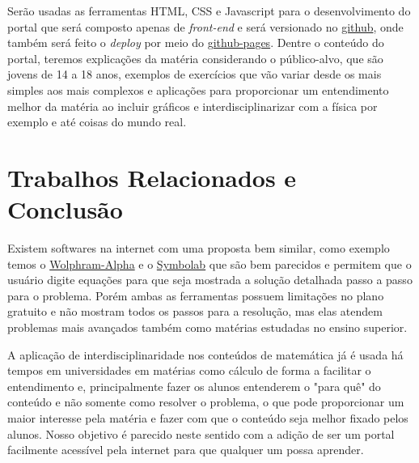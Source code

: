 \documentclass[12pt]{article}
\begin{document}
  Serão usadas as ferramentas HTML, CSS e Javascript para o desenvolvimento do portal que será composto apenas de \textit{front-end} e será versionado no \href{https://github.com/Pedenite/PILC-eq}{github}, onde também será feito o \textit{deploy} por meio do \href{https://pedenite.github.io/PILC-eq/}{github-pages}. Dentre o conteúdo do portal, teremos explicações da matéria considerando o público-alvo, que são jovens de 14 a 18 anos, exemplos de exercícios que vão variar desde os mais simples aos mais complexos e aplicações para proporcionar um entendimento melhor da matéria ao incluir gráficos e interdisciplinarizar com a física por exemplo e até coisas do mundo real.

\section{Trabalhos Relacionados e Conclusão}
  Existem softwares na internet com uma proposta bem similar, como exemplo temos o \href{http://www.wolframalpha.com/}{Wolphram-Alpha} e o \href{https://pt.symbolab.com/}{Symbolab} que são bem parecidos e permitem que o usuário digite equações para que seja mostrada a solução detalhada passo a passo para o problema. Porém ambas as ferramentas possuem limitações no plano gratuito e não mostram todos os passos para a resolução, mas elas atendem problemas mais avançados também como matérias estudadas no ensino superior.

  A aplicação de interdisciplinaridade nos conteúdos de matemática já é usada há tempos em universidades em matérias como cálculo de forma a facilitar o entendimento e, principalmente fazer os alunos entenderem o "para quê" do conteúdo e não somente como resolver o problema, o que pode proporcionar um maior interesse pela matéria e fazer com que o conteúdo seja melhor fixado pelos alunos. Nosso objetivo é parecido neste sentido com a adição de ser um portal facilmente acessível pela internet para que qualquer um possa aprender.
\end{document}
